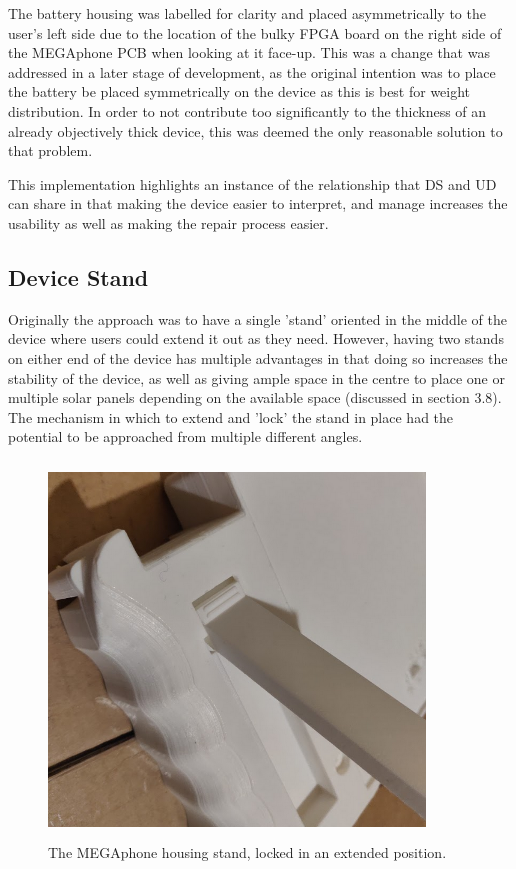 The battery housing was labelled for clarity and placed asymmetrically to the user's left side due to the location of the bulky FPGA board on the right side of the MEGAphone PCB when looking at it face-up.
This was a change that was addressed in a later stage of development, as the original intention was to place the battery be placed symmetrically on the device as this is best for weight distribution.
In order to not contribute too significantly to the thickness of an already objectively thick device, this was deemed the only reasonable solution to that problem.

This implementation highlights an instance of the relationship that DS and UD can share in that making the device easier to interpret, and manage increases the usability as well as making the repair process easier.

\subsection{Device Stand}

Originally the approach was to have a single 'stand' oriented in the middle of the device where users could extend it out as they need.
However, having two stands on either end of the device has multiple advantages in that doing so increases the stability of the device, as well as giving ample space in the centre to place one or multiple solar panels depending on the available space (discussed in section 3.8).
The mechanism in which to extend and 'lock' the stand in place had the potential to be approached from multiple different angles.

\begin{figure} [h]
    \centering
    \includegraphics[width=10cm,height=10cm,keepaspectratio]{Figures/stand_housing.png}
    \caption{The MEGAphone housing stand, locked in an extended position.}
    \label{fig:Stand}
\end{figure}

